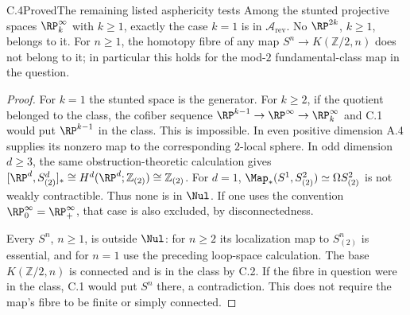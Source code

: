 \begin{claim}{C.4}{Proved}{The remaining listed asphericity tests}
Among the stunted projective spaces $\RP^\infty_k$ with $k\geq1$, exactly the case $k=1$ is in $\mathcal A_{\mathrm{rev}}$. No $\RP^{2k}$, $k\geq1$, belongs to it. For $n\geq1$, the homotopy fibre of any map $S^n\to K(\mathbb Z/2,n)$ does not belong to it; in particular this holds for the mod-$2$ fundamental-class map in the question.
\end{claim}
\begin{proof}
For $k=1$ the stunted space is the generator. For $k\geq2$, if the quotient belonged to the class, the cofiber sequence
$\RP^{k-1}\to\RP^\infty\to\RP^\infty_k$
and C.1 would put $\RP^{k-1}$ in the class. This is impossible. In even positive dimension A.4 supplies its nonzero map to the corresponding $2$-local sphere. In odd dimension $d\geq3$, the same obstruction-theoretic calculation gives
$[\RP^d,S^d_{(2)}]_*\cong H^d(\RP^d;\mathbb Z_{(2)})\cong\mathbb Z_{(2)}$.
For $d=1$, $\Map_*(S^1,S^2_{(2)})\simeq\Omega S^2_{(2)}$ is not weakly contractible. Thus none is in $\Nul$. If one uses the convention $\RP^\infty_0=\RP^\infty_+$, that case is also excluded, by disconnectedness.

Every $S^n$, $n\geq1$, is outside $\Nul$: for $n\geq2$ its localization map to $S^n_{(2)}$ is essential, and for $n=1$ use the preceding loop-space calculation. The base $K(\mathbb Z/2,n)$ is connected and is in the class by C.2. If the fibre in question were in the class, C.1 would put $S^n$ there, a contradiction. This does not require the map's fibre to be finite or simply connected.
\end{proof}

